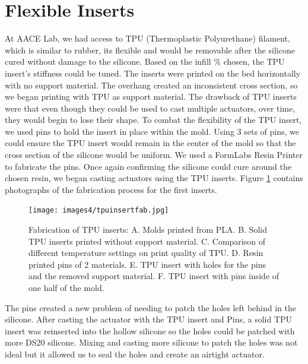 \section{Flexible Inserts}
At AACE Lab, we had access to TPU (Thermoplastic Polyurethane) filament, which is similar to rubber, its flexible and would be removable after the silicone cured without damage to the silicone. Based on the infill \% chosen, the TPU insert's stiffness could be tuned. The inserts were printed on the bed horizontally with no support material. The overhang created an inconsistent cross section, so we began printing with TPU as support material. The drawback of TPU inserts were that even though they could be used to cast multiple actuators, over time, they would begin to lose their shape. To combat the flexibility of the TPU insert, we used pins to hold the insert in place within the mold. Using 3 sets of pins, we could ensure the TPU insert would remain in the center of the mold so that the cross section of the silicone would be uniform. We used a FormLabs Resin Printer to fabricate the pins. Once again confirming the silicone could cure around the chosen resin, we began casting actuators using the TPU inserts. Figure \ref{fig:tpuinsert} contains photographs of the fabrication process for the first inserts. 

\begin{figure}[h]
    \centering
    \texttt{[image: images4/tpuinsertfab.jpg]}
    \caption{Fabrication of TPU inserts: A. Molds printed from PLA. B. Solid TPU inserts printed without support material. C. Comparison of different temperature settings on print quality of TPU. D. Resin printed pins of 2 materials. E. TPU insert with holes for the pins and the removed support material. F. TPU insert with pins inside of one half of the mold.}
    \label{fig:tpuinsert}
\end{figure}

The pins created a new problem of needing to patch the holes left behind in the silicone. After casting the actuator with the TPU insert and Pins, a solid TPU insert was reinserted into the hollow silicone so the holes could be patched with more DS20 silicone. Mixing and casting more silicone to patch the holes was not ideal but it allowed us to seal the holes and create an airtight actuator. 

